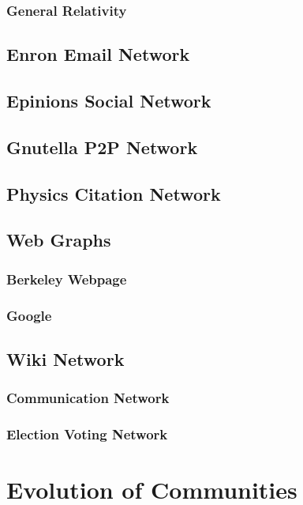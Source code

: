 \documentclass[phd,tocprelim]{cornell}
\begin{document}
\subsection{General Relativity}



\section{Enron Email Network}

\section{Epinions Social Network}

\section{Gnutella P2P Network}

\section{Physics Citation Network}

\section{Web Graphs}

\subsection{Berkeley Webpage}

\subsection{Google}


\section{Wiki Network}

\subsection{Communication Network}

\subsection{Election Voting Network}


\chapter{Evolution of Communities}
\end{document}
